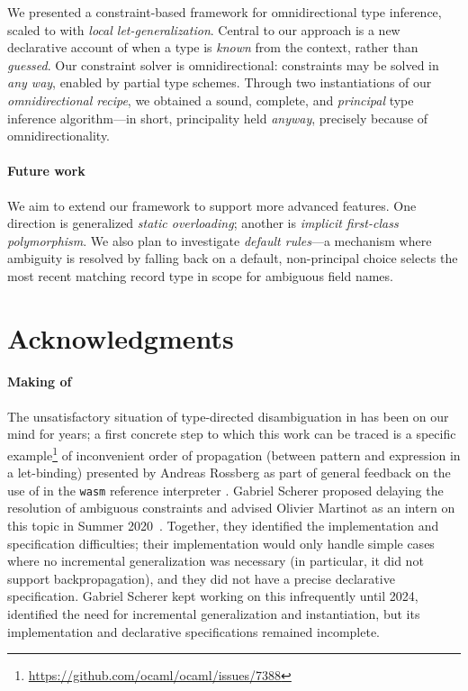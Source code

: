\documentclass[acmsmall,screen,nonacm%
\Anonymous{,anonymous}{}%
\Final{}{,review}%
]{acmart}
\begin{document}
We presented a constraint-based framework for omnidirectional type inference,
scaled to \ML with \emph{local let-generalization}. Central to our approach is
a new declarative account of when a type is \emph{known} from the context,
rather than \emph{guessed}. Our constraint solver is omnidirectional:
constraints may be solved in \emph{any way}, enabled by partial type schemes.
Through two instantiations of our \emph{omnidirectional recipe}, we obtained a
sound, complete, and \emph{principal} type inference algorithm---in short,
principality held \emph{anyway}, precisely because of omnidirectionality.

\paragraph{Future work}

We aim to extend our framework to support more advanced features. One direction
is generalized \emph{static overloading}; another is \emph{implicit first-class 
polymorphism}. We also plan to investigate \emph{default rules}---a mechanism
where ambiguity is resolved by falling back on a default, non-principal choice
\eg \OCaml selects the most recent matching record type in scope for ambiguous
field names.

\section*{Acknowledgments}

\paragraph{Making of}

The unsatisfactory situation of type-directed disambiguation in \OCaml has
been on our mind for years; a first concrete step to which this work
can be traced is a specific
example\footnote{\url{https://github.com/ocaml/ocaml/issues/7388}} of
inconvenient order of propagation (between pattern and expression in
a let-binding) presented by Andreas Rossberg as part of general
feedback on the use of \OCaml in the \texttt{wasm} reference
interpreter \citep*{rossberg-wasm}. Gabriel Scherer proposed delaying
the resolution of ambiguous constraints and advised Olivier Martinot
as an intern on this topic in Summer
2020~\citep*{frozen-constraints-2021}. Together, they
identified the implementation and specification difficulties; their
implementation would only handle simple cases where no incremental
generalization was necessary (in particular, it did not support
backpropagation), and they did not have a precise declarative
specification. Gabriel Scherer kept working on this infrequently until
2024, identified the need for incremental generalization and
instantiation, but its implementation and declarative specifications
remained incomplete.
\end{document}
